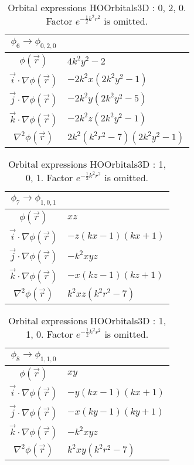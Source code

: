 \begin{table}
\begin{center}
\begin{tabular}{c|l}
$\phi_{6} \rightarrow \phi_{0, 2, 0}$\\
\hline
$\phi(\vec r)$ & $4 k^{2} y^{2} -2$\\
\hline
$\vec i\cdot \nabla \phi(\vec r)$ & $- 2 k^{2} x \left(2 k^{2} y^{2} -1\right)$\\
$\vec j\cdot \nabla \phi(\vec r)$ & $- 2 k^{2} y \left(2 k^{2} y^{2} -5\right)$\\
$\vec k\cdot \nabla \phi(\vec r)$ & $- 2 k^{2} z \left(2 k^{2} y^{2} -1\right)$\\
\hline
$\nabla^2 \phi(\vec r)$ & $2 k^{2} \left(k^{2} r^{2} -7\right) \left(2 k^{2} y^{2} -1\right)$\\
\end{tabular}
\caption{Orbital expressions HOOrbitals3D : 0, 2, 0. Factor $e^{- \frac{1}{2} k^{2} r^{2}}$ is omitted.}
\end{center}
\end{table}


\begin{table}
\begin{center}
\begin{tabular}{c|l}
$\phi_{7} \rightarrow \phi_{1, 0, 1}$\\
\hline
$\phi(\vec r)$ & $x z$\\
\hline
$\vec i\cdot \nabla \phi(\vec r)$ & $- z \left(k x -1\right) \left(k x + 1\right)$\\
$\vec j\cdot \nabla \phi(\vec r)$ & $- k^{2} x y z$\\
$\vec k\cdot \nabla \phi(\vec r)$ & $- x \left(k z -1\right) \left(k z + 1\right)$\\
\hline
$\nabla^2 \phi(\vec r)$ & $k^{2} x z \left(k^{2} r^{2} -7\right)$\\
\end{tabular}
\caption{Orbital expressions HOOrbitals3D : 1, 0, 1. Factor $e^{- \frac{1}{2} k^{2} r^{2}}$ is omitted.}
\end{center}
\end{table}


\begin{table}
\begin{center}
\begin{tabular}{c|l}
$\phi_{8} \rightarrow \phi_{1, 1, 0}$\\
\hline
$\phi(\vec r)$ & $x y$\\
\hline
$\vec i\cdot \nabla \phi(\vec r)$ & $- y \left(k x -1\right) \left(k x + 1\right)$\\
$\vec j\cdot \nabla \phi(\vec r)$ & $- x \left(k y -1\right) \left(k y + 1\right)$\\
$\vec k\cdot \nabla \phi(\vec r)$ & $- k^{2} x y z$\\
\hline
$\nabla^2 \phi(\vec r)$ & $k^{2} x y \left(k^{2} r^{2} -7\right)$\\
\end{tabular}
\caption{Orbital expressions HOOrbitals3D : 1, 1, 0. Factor $e^{- \frac{1}{2} k^{2} r^{2}}$ is omitted.}
\end{center}
\end{table}


